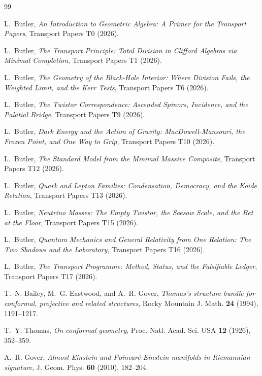 \documentclass[11pt]{article}
\theoremstyle{definition}
\begin{document}
\begin{thebibliography}{99}

L.~Butler,
\emph{An Introduction to Geometric Algebra: A Primer for the Transport Papers},
Transport Papers T0 (2026).

L.~Butler,
\emph{The Transport Principle: Total Division in Clifford Algebras via Minimal Completion},
Transport Papers T1 (2026).

L.~Butler,
\emph{The Geometry of the Black-Hole Interior: Where Division Fails, the Weighted Limit, and the Kerr Tests},
Transport Papers T6 (2026).

L.~Butler,
\emph{The Twistor Correspondence: Ascended Spinors, Incidence, and the Palatial Bridge},
Transport Papers T9 (2026).

L.~Butler,
\emph{Dark Energy and the Action of Gravity: MacDowell-Mansouri, the Frozen Point, and One Way to Grip},
Transport Papers T10 (2026).

L.~Butler,
\emph{The Standard Model from the Minimal Massive Composite},
Transport Papers T12 (2026).

L.~Butler,
\emph{Quark and Lepton Families: Condensation, Democracy, and the Koide Relation},
Transport Papers T13 (2026).

L.~Butler,
\emph{Neutrino Masses: The Empty Twistor, the Seesaw Scale, and the Bet at the Floor},
Transport Papers T15 (2026).

L.~Butler,
\emph{Quantum Mechanics and General Relativity from One Relation: The Two Shadows and the Laboratory},
Transport Papers T16 (2026).

L.~Butler,
\emph{The Transport Programme: Method, Status, and the Falsifiable Ledger},
Transport Papers T17 (2026).

T.~N. Bailey, M.~G. Eastwood, and A.~R. Gover,
\emph{Thomas's structure bundle for conformal, projective and related structures},
Rocky Mountain J. Math. \textbf{24} (1994), 1191--1217.

T.~Y. Thomas,
\emph{On conformal geometry},
Proc. Natl. Acad. Sci. USA \textbf{12} (1926), 352--359.

A.~R. Gover,
\emph{Almost Einstein and Poincar\'e-Einstein manifolds in Riemannian signature},
J. Geom. Phys. \textbf{60} (2010), 182--204.


\end{thebibliography}
\end{document}
